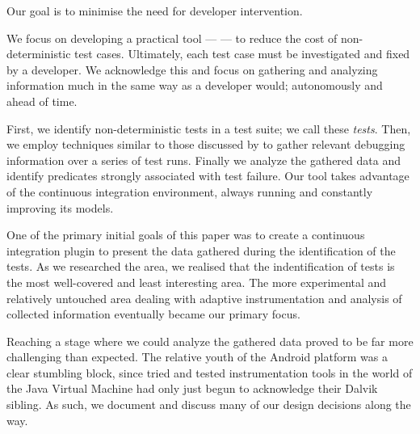 Our goal is to minimise the need for developer intervention.

We focus on developing a practical tool --- \emph{\splatter} --- to reduce the cost of non-deterministic test cases. Ultimately, each test case must be investigated and fixed by a developer. We acknowledge this and focus on gathering and analyzing information much in the same way as a developer would; autonomously and ahead of time.

First, we identify non-deterministic tests in a test suite; we call these \textit{\flaky{} tests}. Then, we employ techniques similar to those discussed by \citet{ArumugaNainar:2010:ABI:1806799.1806839} to gather relevant debugging information over a series of test runs. Finally we analyze the gathered data and identify predicates strongly associated with test failure. Our tool takes advantage of the continuous integration environment, always running and constantly improving its models.

One of the primary initial goals of this paper was to create a continuous integration plugin to present the data gathered during the identification of the \flaky{} tests. As we researched the area, we realised that the indentification of \flaky{} tests is the most well-covered and least interesting area. The more experimental and relatively untouched area dealing with adaptive instrumentation and analysis of collected information eventually became our primary focus.

Reaching a stage where we could analyze the gathered data proved to be far more challenging than expected. The relative youth of the Android platform was a clear stumbling block, since tried and tested instrumentation tools in the world of the Java Virtual Machine had only just begun to acknowledge their Dalvik sibling. As such, we document and discuss many of our design decisions along the way.

